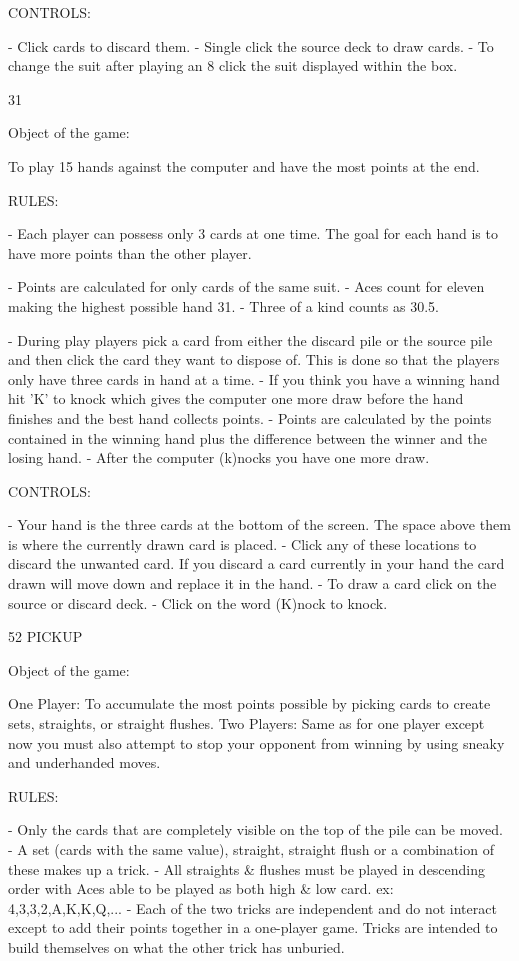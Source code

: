 CONTROLS: 

- Click cards to discard them.
- Single click the source deck to draw cards.
- To change the suit after playing an 8 click the suit
displayed within the box.


31

Object of the game:

     To play 15 hands against the computer and have the most points  
     at the end.

RULES:

- Each player can possess only 3 cards at one time.  The goal for
each hand is to have more points than the other player.

- Points are calculated for only cards of the same suit.
- Aces count for eleven making the highest possible hand 31.
- Three of a kind counts as 30.5.

- During play players pick a card from either the discard pile or the
source pile and then click the card they want to dispose of.  This is
done so that the players only have three cards in hand at a time.
- If you think you have a winning hand hit 'K' to knock which gives
the computer one more draw before the hand finishes and the best
hand collects points.
- Points are calculated by the points contained in the winning hand
plus the difference between the winner and the losing hand.
- After the computer (k)nocks you have one more draw.

CONTROLS:

- Your hand is the three cards at the bottom of the screen. The space
above them is where the currently drawn card is placed.
- Click any of these locations to discard the unwanted card.  If you
discard a card currently in your hand the card drawn will move down
and replace it in the hand.
- To draw a card click on the source or discard deck.
- Click on the word (K)nock to knock.


52 PICKUP

Object of the game:

One Player: To accumulate the most points possible by picking cards  
	    to create sets, straights, or straight flushes.
Two Players: Same as for one player except now you must also attempt  
	    to stop your opponent from winning by using sneaky and   
	    underhanded moves.

RULES:

- Only the cards that are completely visible on the top of the pile
can be moved.
- A set (cards with the same value), straight, straight flush or a
combination of these makes up a trick.
- All straights & flushes must be played in descending order with
Aces able to be played as both high & low card.
       ex: 4,3,3,2,A,K,K,Q,...
- Each of the two tricks are independent and do not interact except
to add their points together in a one-player game. Tricks are
intended to build themselves on what the other trick has unburied.

